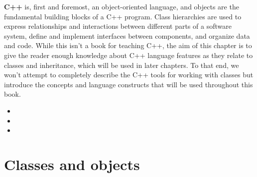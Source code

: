 
\textbf{C++} is, first and foremost, an object-oriented language, and objects are the fundamental building blocks of a C++ program. Class hierarchies are used to express relationships and interactions between different parts of a software system, define and implement interfaces between components, and organize data and code. While this isn't a book for teaching C++, the aim of this chapter is to give the reader enough knowledge about C++ language features as they relate to classes and inheritance, which will be used in later chapters. To that end, we won't attempt to completely describe the C++ tools for working with classes but introduce the concepts and language constructs that will be used throughout this book.


\begin{itemize}
\item
\item
\item
\end{itemize}

\section{Classes and objects}

